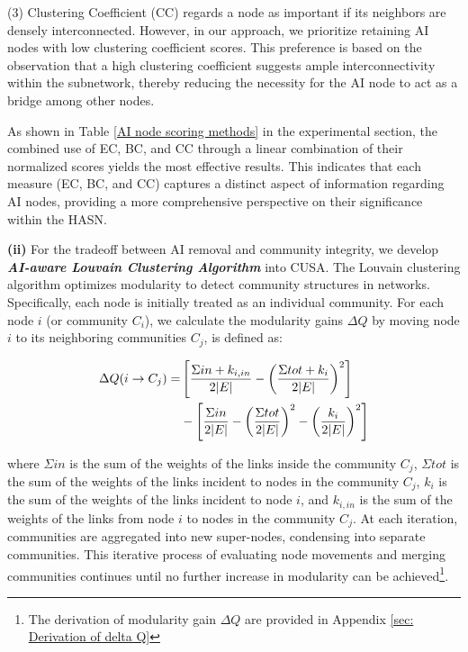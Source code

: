 \noindent (3) Clustering Coefficient (CC) \cite{watts1998collective}  regards a node as important if its neighbors are densely interconnected. However, in our approach, we prioritize retaining AI nodes with low clustering coefficient scores. This preference is based on the observation that a high clustering coefficient suggests ample interconnectivity within the subnetwork, thereby reducing the necessity for the AI node to act as a bridge among other nodes.

As shown in Table \ref{AI node scoring methods} in the experimental section, the combined use of EC, BC, and CC through a linear combination of their normalized scores yields the most effective results. This indicates that each measure (EC, BC, and CC) captures a distinct aspect of information regarding AI nodes, providing a more comprehensive perspective on their significance within the HASN.

\textbf{(ii)} For the tradeoff between AI removal and community integrity, we develop \textit{\textbf{AI-aware Louvain Clustering Algorithm}} into CUSA. The Louvain clustering algorithm \cite{blondel2008fast} optimizes modularity to detect community structures in networks. Specifically, each node is initially treated as an individual community. For each node $i$ (or community $C_i$), we calculate the modularity gains $\Delta Q$ by moving node $i$ to its neighboring communities $C_j$, is defined as:

\begin{align}
\Delta Q(i \rightarrow C_j) = &\left[ \frac{\Sigma in + k_{i,in}}{2|E|} - \left(\frac{\Sigma tot + k_i}{2|E|}\right)^2 \right] \notag \\
&- \left[ \frac{\Sigma in }{2|E|} - \left(\frac{\Sigma tot}{2|E|}\right)^2 - \left(\frac{k_i}{2|E|}\right)^2 \right]
\end{align}
\vspace{0.5em}

\noindent where $\Sigma in$ is the sum of the weights of the links inside the community $C_j$, $\Sigma tot$ is the sum of the weights of the links incident to nodes in the community $C_j$, $k_i$ is the sum of the weights of the links incident to node $i$, and $k_{i, in}$ is the sum of the weights of the links from node $i$ to nodes in the community $C_j$. At each iteration, communities are aggregated into new super-nodes, condensing into separate communities. This iterative process of evaluating node movements and merging communities continues until no further increase in modularity can be achieved\footnote{The derivation of modularity gain $\Delta Q$ are provided in Appendix \ref{sec: Derivation of delta Q}}.

